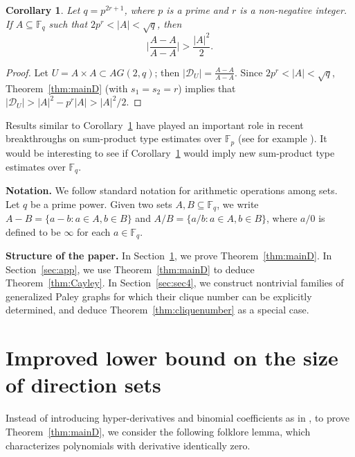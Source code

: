 \documentclass[12pt,reqno]{amsart}
\newtheorem{cor}[thm]{Corollary}
\theoremstyle{definition}
\newcommand{\F}{\mathbb{F}}
\begin{document}
\begin{cor}\label{cor:sum-product}
Let $q=p^{2r+1}$, where $p$ is a prime and $r$ is a non-negative integer. If $A \subseteq \F_q$ such that $2p^r<|A|<\sqrt{q}$, then 
$$
\bigg|\frac{A-A}{A-A}\bigg| >\frac{|A|^2}{2}.
$$
\end{cor}
\begin{proof}
Let $U=A \times A \subset AG(2,q)$; then $|\mathcal{D}_U|=\frac{A-A}{A-A}$. Since $2p^r<|A|<\sqrt{q}$, Theorem~\ref{thm:mainD} (with $s_1=s_2=r$) implies that $|\mathcal{D}_U|>|A|^2-p^r|A|>|A|^2/2$.
\end{proof}

Results similar to Corollary~\ref{cor:sum-product} have played an important role in recent breakthroughs on sum-product type estimates over $\F_p$ (see for example \cite{MPRRS19, SS22}). It would be interesting to see if Corollary~\ref{cor:sum-product} would imply new sum-product type estimates over $\F_q$. 

\medskip

\textbf{Notation.} We follow standard notation for arithmetic operations among sets. Let $q$ be a prime power. Given two sets $A,B \subseteq \F_q$, we write $A-B=\{a-b: a \in A, b \in B\}$ and $A/B=\{a/b: a \in A, b \in B\}$, where $a/0$ is defined to be $\infty$ for each $a\in \F_q$.



\textbf{Structure of the paper.} In Section~\ref{sec:sec2}, we prove Theorem~\ref{thm:mainD}. %
In Section~\ref{sec:app}, we use Theorem~\ref{thm:mainD} to deduce Theorem~\ref{thm:Cayley}. In Section~\ref{sec:sec4}, we construct nontrivial families of generalized Paley graphs for which their clique number can be explicitly determined, and deduce Theorem~\ref{thm:cliquenumber} as a special case. 

\section{Improved lower bound on the size of direction sets}\label{sec:sec2}
Instead of introducing hyper-derivatives and binomial coefficients as in \cite{Yip2, Yip1}, to prove Theorem~\ref{thm:mainD}, we consider the following folklore lemma, which characterizes polynomials with derivative identically zero. %
\end{document}
